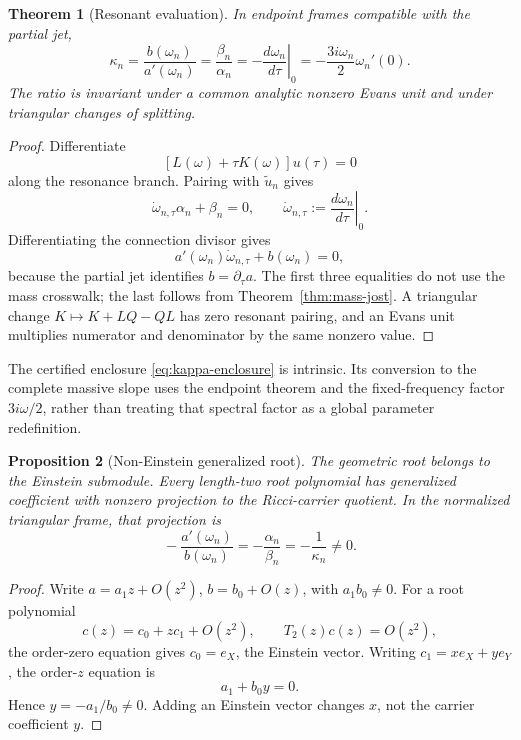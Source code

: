 \documentclass[11pt]{article}
\newtheorem{theorem}{Theorem}[section]
\newtheorem{proposition}[theorem]{Proposition}
\theoremstyle{remark}
\begin{document}
\begin{theorem}[Resonant evaluation]\label{thm:resonant-evaluation}
In endpoint frames compatible with the partial jet,
\begin{equation}\label{eq:unified-invariant}
 \boxed{\;
 \kappa_n
 =\frac{b(\omega_n)}{a'(\omega_n)}
 =\frac{\beta_n}{\alpha_n}
 =-\left.\frac{d\omega_n}{d\tau}\right|_0
 =-\frac{3i\omega_n}{2}\omega_n'(0).
 \;}
\end{equation}
The ratio is invariant under a common analytic nonzero Evans unit and
under triangular changes of splitting.
\end{theorem}

\begin{proof}
Differentiate
\[
 [L(\omega)+\tau K(\omega)]u(\tau)=0
\]
along the resonance branch.  Pairing with \(\widetilde u_n\) gives
\[
 \dot\omega_{n,\tau}\alpha_n+\beta_n=0,
 \qquad
 \dot\omega_{n,\tau}:=\left.\frac{d\omega_n}{d\tau}\right|_0.
\]
Differentiating the connection divisor gives
\[
 a'(\omega_n)\dot\omega_{n,\tau}+b(\omega_n)=0,
\]
because the partial jet identifies \(b=\partial_\tau a\).  The first three
equalities do not use the mass crosswalk; the last follows from
Theorem~\ref{thm:mass-jost}.  A triangular change
\(K\mapsto K+LQ-QL\) has zero resonant pairing, and an Evans unit
multiplies numerator and denominator by the same nonzero value.
\end{proof}

The certified enclosure \eqref{eq:kappa-enclosure} is intrinsic.  Its
conversion to the complete massive slope uses the endpoint theorem and
the fixed-frequency factor \(3i\omega/2\), rather than treating that
spectral factor as a global parameter redefinition.

\begin{proposition}[Non-Einstein generalized root]
\label{prop:non-einstein-root}
The geometric root belongs to the Einstein submodule.  Every length-two
root polynomial has generalized coefficient with nonzero projection to
the Ricci-carrier quotient.  In the normalized triangular frame, that
projection is
\[
 \boxed{\;
 -\frac{a'(\omega_n)}{b(\omega_n)}
 =-\frac{\alpha_n}{\beta_n}
 =-\frac1{\kappa_n}\ne0.
 \;}
\]
\end{proposition}

\begin{proof}
Write \(a=a_1z+O(z^2)\), \(b=b_0+O(z)\), with \(a_1b_0\ne0\).
For a root polynomial
\[
 c(z)=c_0+zc_1+O(z^2),\qquad
 T_2(z)c(z)=O(z^2),
\]
the order-zero equation gives \(c_0=e_X\), the Einstein vector.
Writing \(c_1=xe_X+ye_Y\), the order-\(z\) equation is
\[
 a_1+b_0y=0.
\]
Hence \(y=-a_1/b_0\ne0\).  Adding an Einstein vector changes \(x\), not
the carrier coefficient \(y\).
\end{proof}
\end{document}
